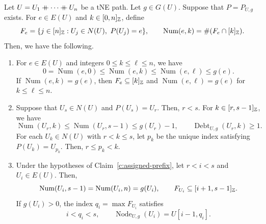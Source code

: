 \begin{lemma}\label{lem:precursor-prefix-counts}
Let $U=U_1\mathbin{+\mkern-10mu+}\cdots\mathbin{+\mkern-10mu+} U_n$ be a tNE path. Let $g\in G(U)$. Suppose that
$P=P_{U,g}$ exists. For $e\in E(U)$ and $k\in[0,n]_{\mathbb Z}$, define
\[
 F_e=\{j\in[n]_{\Z}:U_j\in N(U),\ P(U_j)=e\},\qquad
 \operatorname{Num}(e,k)=\#(F_e\cap[k]_{\Z}).
\]
Then, we have the following.
\begin{enumerate}
\item\label{c:prefix-capacity} For $e\in E(U)$ and integers $0\le k\le\ell\le n$, we have
\[
 0=\operatorname{Num}(e,0)\le \operatorname{Num}(e,k)\le \operatorname{Num}(e,\ell)\le g(e).
\]
If $\operatorname{Num}(e,k)=g(e)$, then $F_e\subseteq[k]_{\mathbb Z}$ and
$\operatorname{Num}(e,\ell)=g(e)$ for $k\le\ell\le n$.
\item\label{c:assigned-prefix} Suppose that $U_s\in N(U)$ and $P(U_s)=U_r$.
Then, $r<s$. For $k\in[r,s-1]_{\mathbb Z}$, we have
\[
 \operatorname{Num}(U_r,k)\le \operatorname{Num}(U_r,s-1)\le g(U_r)-1,\qquad
 \operatorname{Debt}_{U,g}(U_r,k)\ge1.
\]
For each $U_k\in N(U)$ with $r<k\le s$, let $p_k$ be the unique index
satisfying $P(U_k)=U_{p_k}$. Then, $r\le p_k<k$.
\item\label{c:interior-prefix} Under the hypotheses of Claim~\ref{c:assigned-prefix},
let $r<i<s$ and $U_i\in E(U)$. Then,
\[
 \operatorname{Num}(U_i,s-1)=\operatorname{Num}(U_i,n)=g(U_i),\qquad
 F_{U_i}\subseteq[i+1,s-1]_{\mathbb Z}.
\]
If $g(U_i)>0$, the index $q_i=\max F_{U_i}$ satisfies
\[
 i<q_i<s,\qquad \operatorname{Node}_{U,g}(U_i)=U[i-1,q_i].
\]
\end{enumerate}
\end{lemma}
